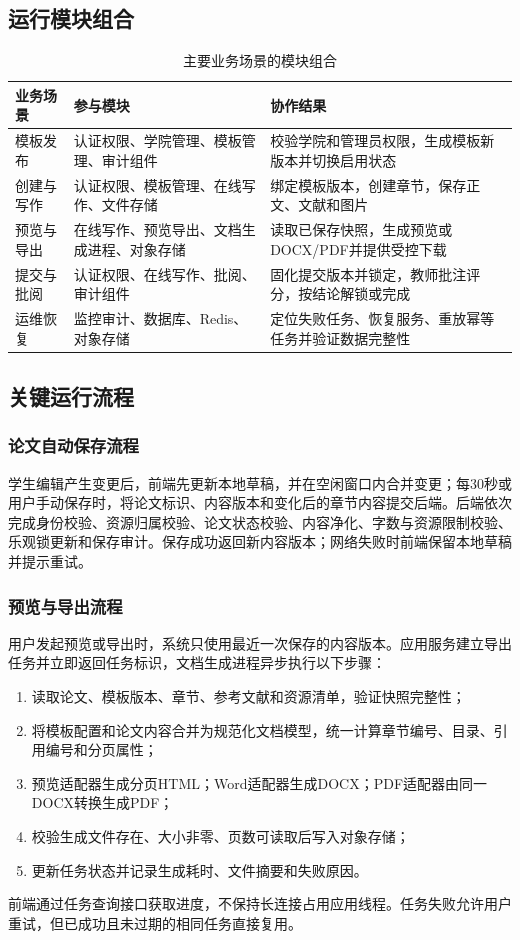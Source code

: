 \documentclass{../template/softeng}
\begin{document}
	\subsection{运行模块组合}
	\begin{table}[htbp]
		\centering
		\small
		\caption{主要业务场景的模块组合}
		\begin{tabular}{p{2.4cm}p{5.0cm}p{4.6cm}}
			\toprule
			业务场景 & 参与模块 & 协作结果 \\
			\midrule
			模板发布 & 认证权限、学院管理、模板管理、审计组件 & 校验学院和管理员权限，生成模板新版本并切换启用状态 \\
			创建与写作 & 认证权限、模板管理、在线写作、文件存储 & 绑定模板版本，创建章节，保存正文、文献和图片 \\
			预览与导出 & 在线写作、预览导出、文档生成进程、对象存储 & 读取已保存快照，生成预览或DOCX/PDF并提供受控下载 \\
			提交与批阅 & 认证权限、在线写作、批阅、审计组件 & 固化提交版本并锁定，教师批注评分，按结论解锁或完成 \\
			运维恢复 & 监控审计、数据库、Redis、对象存储 & 定位失败任务、恢复服务、重放幂等任务并验证数据完整性 \\
			\bottomrule
		\end{tabular}
	\end{table}
	
	\subsection{关键运行流程}
	\subsubsection{论文自动保存流程}
	学生编辑产生变更后，前端先更新本地草稿，并在空闲窗口内合并变更；每30秒或用户手动保存时，将论文标识、内容版本和变化后的章节内容提交后端。后端依次完成身份校验、资源归属校验、论文状态校验、内容净化、字数与资源限制校验、乐观锁更新和保存审计。保存成功返回新内容版本；网络失败时前端保留本地草稿并提示重试。
	
	\subsubsection{预览与导出流程}
	用户发起预览或导出时，系统只使用最近一次保存的内容版本。应用服务建立导出任务并立即返回任务标识，文档生成进程异步执行以下步骤：
	\begin{enumerate}
		\item 读取论文、模板版本、章节、参考文献和资源清单，验证快照完整性；
		\item 将模板配置和论文内容合并为规范化文档模型，统一计算章节编号、目录、引用编号和分页属性；
		\item 预览适配器生成分页HTML；Word适配器生成DOCX；PDF适配器由同一DOCX转换生成PDF；
		\item 校验生成文件存在、大小非零、页数可读取后写入对象存储；
		\item 更新任务状态并记录生成耗时、文件摘要和失败原因。
	\end{enumerate}
	前端通过任务查询接口获取进度，不保持长连接占用应用线程。任务失败允许用户重试，但已成功且未过期的相同任务直接复用。
	
\end{document}
